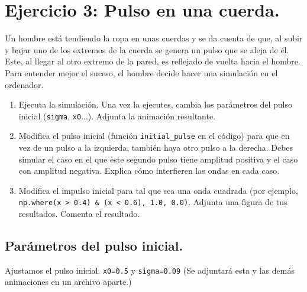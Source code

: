 \documentclass[a4paper,12pt]{article} %
\begin{document}
\vspace{\baselineskip}

\section{ Ejercicio 3: Pulso en una cuerda.}

\begin{justify}
Un hombre está tendiendo la ropa en unas cuerdas y se da cuenta de que, al subir y bajar uno de los extremos de la cuerda se genera un pulso que se aleja de él. Este, al llegar al otro extremo de la pared, es reflejado de vuelta hacia el hombre. Para entender mejor el suceso, el hombre decide hacer una simulación en el ordenador.
\end{justify}

\begin{enumerate}
    \item Ejecuta la simulación. Una vez la ejecutes, cambia los parámetros del pulso inicial (\texttt{sigma}, \texttt{x0}...). Adjunta la animación resultante.
    
    \item Modifica el pulso inicial (función \texttt{initial\_pulse} en el código) para que en vez de un pulso a la izquierda, también haya otro pulso a la derecha. Debes simular el caso en el que este segundo pulso tiene amplitud positiva y el caso con amplitud negativa. Explica cómo interfieren las ondas en cada caso.
    
    \item Modifica el impulso inicial para tal que sea una onda cuadrada (por ejemplo, \texttt{np.where(x > 0.4) \& (x < 0.6), 1.0, 0.0)}. Adjunta una figura de tus resultados. Comenta el resultado.
\end{enumerate}

\vspace{\baselineskip}

\subsection{Parámetros del pulso inicial.}

\vspace{\baselineskip}

\begin{justify}
    Ajustamos el pulso inicial.  \texttt{x0=0.5} y \texttt{sigma=0.09} (Se adjuntará esta y las demás animaciones en un archivo aparte.)
\end{justify}
\end{document}
